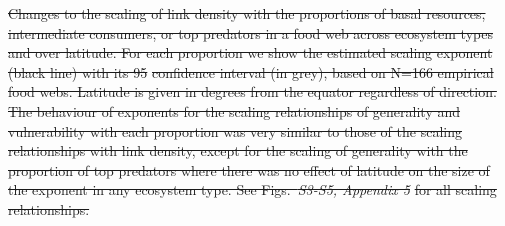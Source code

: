 \documentclass[12pt]{article}
\providecommand{\DIFdel}[1]{{\protect\color{red}\sout{#1}}}                      %
\providecommand{\DIFdelbegin}{} %
\providecommand{\DIFdelend}{} %
\begin{document}
\DIFdelbegin %
{%
\DIFdel{Changes to the scaling of link density with the proportions of basal resources, intermediate
consumers, or top predators in a food web across ecosystem types and over latitude. For each proportion
we show the estimated scaling exponent (black line) with its 95}%
\DIFdel{confidence interval (in grey), based
on N=166 empirical food webs. Latitude is given in degrees from the equator regardless of direction. 
The behaviour of exponents for the scaling relationships of generality and vulnerability with each 
proportion was very similar to those of the scaling relationships with link density, except for the 
scaling of generality with the proportion of top predators where there was no effect of latitude on the 
size of the exponent in any ecosystem type. See Figs.~}\emph{\DIFdel{S3-S5, Appendix 5}} %
\DIFdel{for all scaling relationships.}}
\DIFdelend %
\end{document}
